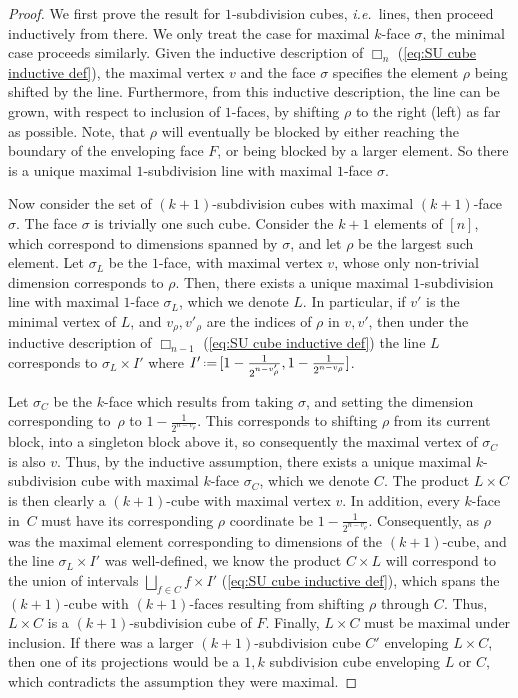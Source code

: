 \documentclass{amsart}
\theoremstyle{definition}
\newcommand{\eqdef}{\mbox{\,\raisebox{0.2ex}{\scriptsize\ensuremath{\mathrm:}}\ensuremath{=}\,}} %
\newcommand{\ie}{\textit{i.e.}~} %
\newcommand{\divcube}[1]{\Box_{#1}}
\begin{document}
\begin{proof}
We first prove the result for $1$-subdivision cubes, \ie lines, then proceed inductively from there.
We only treat the case for maximal $k$-face $\sigma$, the minimal case proceeds similarly.
Given the inductive description of $\divcube{n}$ (\cref{eq:SU cube inductive def}), the maximal vertex $v$ and the face $\sigma$ specifies the element $\rho$ being shifted by the line.
Furthermore, from this inductive description, the line can be grown, with respect to inclusion of $1$-faces, by shifting $\rho$ to the right (left) as far as possible.
Note, that $\rho$ will eventually be blocked by either reaching the boundary of the enveloping face $F$, or being blocked by a larger element.
So there is a unique maximal $1$-subdivision line with maximal $1$-face $\sigma$.

Now consider the set of $(k+1)$-subdivision cubes with maximal $(k+1)$-face $\sigma$.
The face $\sigma$ is trivially one such cube.
Consider the $k+1$ elements of $[n]$, which correspond to dimensions spanned by $\sigma$, and let $\rho$ be the largest such element.
Let $\sigma_L$ be the $1$-face, with maximal vertex $v$, whose only non-trivial dimension corresponds to $\rho$.
Then, there exists a unique maximal $1$-subdivision line with maximal $1$-face $\sigma_L$, which we denote $L$.
In particular, if $v'$ is the minimal vertex of $L$, and $v_\rho, v'_\rho$ are the indices of $\rho$ in $v,v'$, then under the inductive description of $\divcube{n-1}$ (\cref{eq:SU cube inductive def}) the line $L$ corresponds to $\sigma_L \times I'$ where $I'\eqdef[1-\frac{1}{2^{n-v'_\rho}},1-\frac{1}{2^{n-v_\rho}}]$.

Let $\sigma_C$ be the $k$-face which results from taking $\sigma$, and setting the dimension corresponding to~$\rho$ to $1-\frac{1}{2^{n-v_\rho}}$.
This corresponds to shifting $\rho$ from its current block, into a singleton block above it, so consequently the maximal vertex of $\sigma_C$ is also $v$.
Thus, by the inductive assumption, there exists a unique maximal $k$-subdivision cube with maximal $k$-face $\sigma_C$, which we denote $C$.
The product $L\times C$ is then clearly a $(k+1)$-cube with maximal vertex $v$.
In addition, every $k$-face in~$C$ must have its corresponding $\rho$ coordinate be $1-\frac{1}{2^{n-v_\rho}}$.
Consequently, as $\rho$ was the maximal element corresponding to dimensions of the $(k+1)$-cube, and the line $\sigma_L \times I'$ was well-defined, we know the product $C\times L$ will correspond to the union of intervals $\bigsqcup_{f\in C}f \times I'$ (\cref{eq:SU cube inductive def}), which spans the $(k+1)$-cube with $(k+1)$-faces resulting from shifting $\rho$ through $C$.
Thus, $L\times C$ is a $(k+1)$-subdivision cube of $F$.
Finally, $L\times C$ must be maximal under inclusion.
If there was a larger $(k+1)$-subdivision cube $C'$ enveloping $L\times C$, then one of its projections would be a $1,k$ subdivision cube enveloping $L$ or $C$, which contradicts the assumption they were maximal.
\end{proof}
\end{document}
